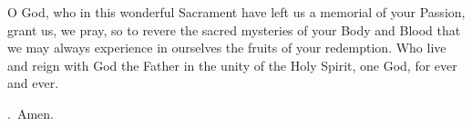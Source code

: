 \lettrine[lines=3]{O}{} God, who in this wonderful Sacrament
have left us a memorial of your Passion,
grant us, we pray,
so to revere the sacred mysteries of your Body and Blood
that we may always experience in ourselves
the fruits of your redemption.
Who live and reign with God the Father
in the unity of the Holy Spirit,
one God, for ever and ever. \par \Rbar.~Amen.
